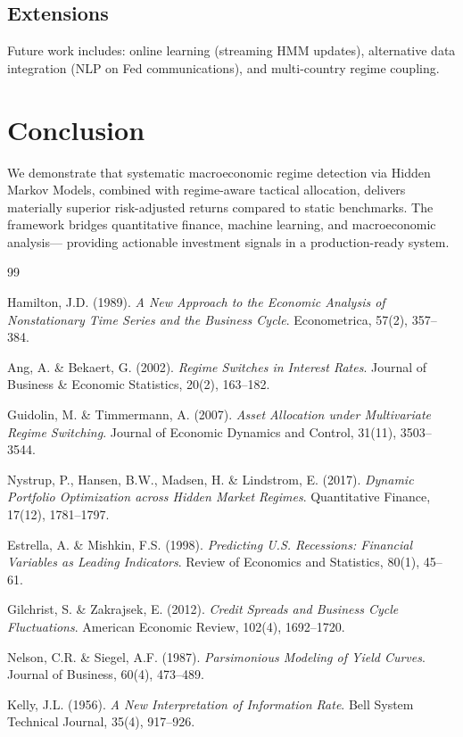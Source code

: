 \documentclass[12pt, a4paper]{article}
\begin{document}
\subsection{Extensions}

Future work includes: online learning (streaming HMM updates), alternative data
integration (NLP on Fed communications), and multi-country regime coupling.

\section{Conclusion}

We demonstrate that systematic macroeconomic regime detection via Hidden Markov
Models, combined with regime-aware tactical allocation, delivers materially
superior risk-adjusted returns compared to static benchmarks. The framework
bridges quantitative finance, machine learning, and macroeconomic analysis---
providing actionable investment signals in a production-ready system.

\begin{thebibliography}{99}

Hamilton, J.D. (1989).
\textit{A New Approach to the Economic Analysis of Nonstationary Time Series and the Business Cycle}.
Econometrica, 57(2), 357--384.

Ang, A. \& Bekaert, G. (2002).
\textit{Regime Switches in Interest Rates}.
Journal of Business \& Economic Statistics, 20(2), 163--182.

Guidolin, M. \& Timmermann, A. (2007).
\textit{Asset Allocation under Multivariate Regime Switching}.
Journal of Economic Dynamics and Control, 31(11), 3503--3544.

Nystrup, P., Hansen, B.W., Madsen, H. \& Lindstrom, E. (2017).
\textit{Dynamic Portfolio Optimization across Hidden Market Regimes}.
Quantitative Finance, 17(12), 1781--1797.

Estrella, A. \& Mishkin, F.S. (1998).
\textit{Predicting U.S. Recessions: Financial Variables as Leading Indicators}.
Review of Economics and Statistics, 80(1), 45--61.

Gilchrist, S. \& Zakrajsek, E. (2012).
\textit{Credit Spreads and Business Cycle Fluctuations}.
American Economic Review, 102(4), 1692--1720.

Nelson, C.R. \& Siegel, A.F. (1987).
\textit{Parsimonious Modeling of Yield Curves}.
Journal of Business, 60(4), 473--489.

Kelly, J.L. (1956).
\textit{A New Interpretation of Information Rate}.
Bell System Technical Journal, 35(4), 917--926.

\end{thebibliography}
\end{document}
